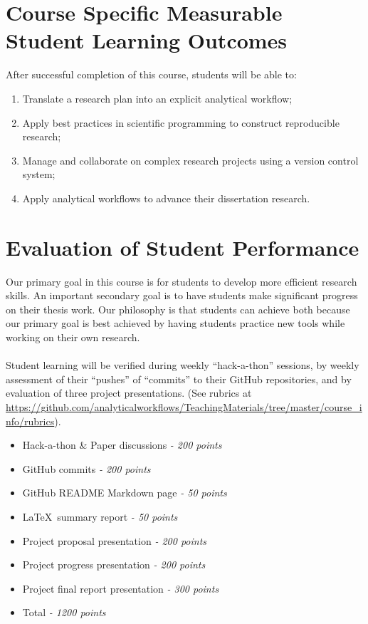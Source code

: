 \documentclass[10pt]{article}
\begin{document}
\section*{Course Specific Measurable Student Learning Outcomes}
After successful completion of this course, students will be able to:
\begin{enumerate}[leftmargin=2cm]
	\itemsep0em
	\item Translate a research plan into an explicit analytical workflow;
	\item Apply best practices in scientific programming to construct reproducible research;
	\item Manage and collaborate on complex research projects using a version control system;
	\item Apply analytical workflows to advance their dissertation research.
\end{enumerate}

\clearpage
\section*{Evaluation of Student Performance}
Our primary goal in this course is for students to develop more efficient research skills.  
An important secondary goal is to have students make significant progress on their thesis work.  
Our philosophy is that students can achieve both because our primary goal is best achieved by having 
students practice new tools while working on their own research.
\\\\
Student learning will be verified during weekly ``hack-a-thon'' sessions, by weekly assessment of their 
``pushes'' of ``commits'' to their GitHub repositories, and by evaluation of three project presentations.  
(See rubrics at 
\url{https://github.com/analyticalworkflows/TeachingMaterials/tree/master/course_info/rubrics}).

\begin{itemize}[leftmargin=2cm]
\itemsep0em
\item Hack-a-thon \& Paper discussions \emph{- 200 points}
\item GitHub commits \emph{- 200 points}
\item GitHub README Markdown page \emph{- 50 points}
\item \LaTeX\ summary report \emph{- 50 points}
\item Project proposal presentation \emph{- 200 points}
\item Project progress presentation \emph{- 200 points}
\item Project final report presentation \emph{- 300 points}
\item Total \emph{- 1200 points}
\end{itemize}
\end{document}
